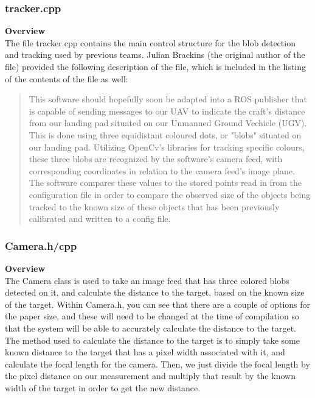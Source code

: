 \subsubsection{tracker.cpp}
\large{\textbf{Overview}}\\
\normalsize
\noindent The file tracker.cpp contains the main control structure for the blob detection and tracking used by previous teams. Julian Brackins (the original author of the file) provided the following description of the file, which is included in the listing of the contents of the file as well:

\begin{quote}
\centering
This software should hopefully soon be adapted into a ROS publisher that is capable of sending messages to our UAV to indicate the craft's distance from our landing pad situated on our Unmanned Ground Vechicle (UGV). This is done using three equidistant coloured dots, or "blobs" situated on our landing pad. Utilizing OpenCv's libraries for tracking specific colours, these three blobs are recognized by the software's camera feed, with corresponding coordinates in relation to the camera feed's image plane. The software compares these values to the stored points read in from the configuration file in order to compare the observed size of the objects being tracked to the known size of these objects that has been previously calibrated and written to a config file.
\end{quote}





\subsubsection{Camera.h/cpp}
\large{\textbf{Overview}}\\
\normalsize
\noindent The Camera class is used to take an image feed that has three colored blobs detected on it, and calculate the distance to the target, based on the known size of the target. Within Camera.h, you can see that there are a couple of options for the paper size, and these will need to be changed at the time of compilation so that the system will be able to accurately calculate the distance to the target. The method used to calculate the distance to the target is to simply take some known distance to the target that has a pixel width associated with it, and calculate the focal length for the camera. Then, we just divide the focal length by the pixel distance on our measurement and multiply that result by the known width of the target in order to get the new distance.


